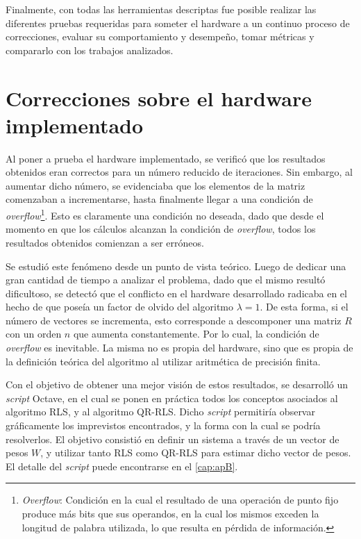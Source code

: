 Finalmente, con todas las herramientas descriptas fue posible realizar las diferentes pruebas requeridas para someter el hardware a un continuo proceso de correcciones, evaluar su comportamiento y desempeño, tomar métricas y compararlo con los trabajos analizados. 

\section{Correcciones sobre el hardware implementado}

Al poner a prueba el hardware implementado, se verificó que los resultados obtenidos eran correctos para un número reducido de iteraciones. Sin embargo, al aumentar dicho número, se evidenciaba que los elementos de la matriz comenzaban a incrementarse, hasta finalmente llegar a una condición de \textit{overflow}\footnote{\label{overflow}\textit{Overflow}: Condición en la cual el resultado de una operación de punto fijo produce más bits que sus operandos, en la cual los mismos exceden la longitud de palabra utilizada, lo que resulta en pérdida de información.}. Esto es claramente una condición no deseada, dado que desde el momento en que los cálculos alcanzan la condición de \textit{overflow}, todos los resultados obtenidos comienzan a ser erróneos.

Se estudió este fenómeno desde un punto de vista teórico. Luego de dedicar una gran cantidad de tiempo a analizar el problema, dado que el mismo resultó dificultoso, se detectó que el conflicto en el hardware desarrollado radicaba en el hecho de que poseía un factor de olvido del algoritmo $\lambda = 1$. De esta forma, si el número de vectores se incrementa, esto corresponde a descomponer una matriz $R$ con un orden $n$ que aumenta constantemente. Por lo cual, la condición de \textit{overflow} es inevitable. La misma no es propia del hardware, sino que es propia de la definición teórica del algoritmo al utilizar aritmética de precisión finita.

Con el objetivo de obtener una mejor visión de estos resultados, se desarrolló un \textit{script} Octave, en el cual se ponen en práctica todos los conceptos asociados al algoritmo RLS, y al algoritmo QR-RLS. Dicho \textit{script} permitiría observar gráficamente los imprevistos encontrados, y la forma con la cual se podría resolverlos. El objetivo consistió en definir un sistema a través de un vector de pesos $W$, y utilizar tanto RLS como QR-RLS para estimar dicho vector de pesos. El detalle del \textit{script} puede encontrarse en el \autoref{cap:apB}.

